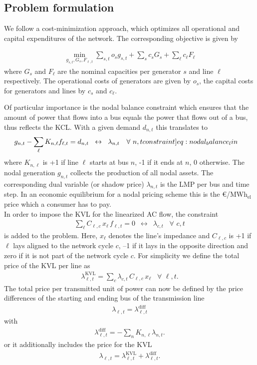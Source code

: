 \documentclass[11pt,twocolumn]{article}
\newcommand{\resultsin}[1]{\hspace{6pt} \leftrightarrow  \hspace{6pt} #1}
\newcommand{\Forall}[1]{\hspace{10pt} \forall \,\, #1 }
\newcommand{\nodalgeneration}[1][n]{g_{#1,t}}
\newcommand{\flow}{f_{\ell,t}}
\newcommand{\lmp}[1][n]{\lambda_{#1,t}}
\newcommand{\lmpdiff}[1][\ell]{\lmp[#1]^\text{diff}}
\newcommand{\lmpkvl}[1][\ell]{\lmp[#1]^\text{KVL}}
\newcommand{\demand}[1][n]{d_{#1,t}}
\newcommand{\incidence}[1][n]{K_{#1,\ell}}
\newcommand{\cycle}{C_{\ell,c}}
\newcommand{\reactance}{x_\ell}
\newcommand{\cycleprice}{\lambda_{c,t}}
\newcommand{\megawatthour}{MWh$_\text{el}$}
\begin{document}
\subsection{Problem formulation}
\label{sec:problem_formulation}

We follow a cost-minimization approach, which optimizes all operational and capital expenditures of the network. The corresponding objective is given by 

\begin{align}
    \min_{g_{s,t}, G_s, F_{\ell, t}} \sum_{s,t} o_s g_{s,t} + \sum_s c_s G_s + \sum_\ell c_\ell F_\ell
\end{align}
where $G_s$ and $F_\ell$ are the nominal capacities per generator $s$ and line $\ell$ respectively. The operational costs of generators are given by $o_s$, the capital costs for generators and lines by $c_s$ and $c_\ell$. 

Of particular importance is the nodal balance constraint which ensures that the amount of power that flows into a bus equals the power that flows out of a bus, thus reflects the \ac{KCL}. With a given demand $\demand$ this translates to   
\begin{align}
    \nodalgeneration - \sum_\ell \incidence \flow  &=  \demand 
     \resultsin{\lmp} \Forall{n,t}
    \label[constraint]{eq:nodal_balance_lin}
\end{align}
where $\incidence$ is +1 if line $\ell$ starts at bus $n$, -1 if it ends at $n$, 0 otherwise. The nodal generation $\nodalgeneration$ collects the production of all nodal assets. The corresponding dual variable (or shadow price) $\lmp$ is the \ac{LMP} per bus and time step. In an economic equilibrium for a nodal pricing scheme this is the \euro/\megawatthour price which a consumer has to pay.\\

In order to impose the \ac{KVL} for the linearized \ac{AC} flow, the constraint 
\begin{align}
    \sum_{\ell} \cycle \, \reactance \, \flow = 0 \resultsin{\cycleprice} \Forall{c,t} 
\end{align}
is added to the problem. Here, $\reactance$ denotes the line's impedance and $\cycle$ is +1 if $\ell$ lays aligned to the network cycle $c$, --1 if it lays in the opposite direction and zero if it is not part of the network cycle $c$.
For simplicity we define the total price of the \ac{KVL} per line as 
\begin{align}
    \lmpkvl = \sum_c \cycleprice\, \cycle\, \reactance \Forall{\ell,t} .
\end{align} 
The total price per transmitted unit of power can now be defined by the price differences of the starting and ending bus of the transmission line
\begin{align}
    \lmp[\ell] = \lmpdiff 
\end{align}
with 
\begin{align}
    \lmpdiff = -\sum_n \incidence \lmp .
\end{align}
or it additionally includes the price for the \ac{KVL}
\begin{align}
    \lmp[\ell] = \lmpkvl + \lmpdiff .
    \label{eq:congestion_price}
\end{align}
\end{document}
